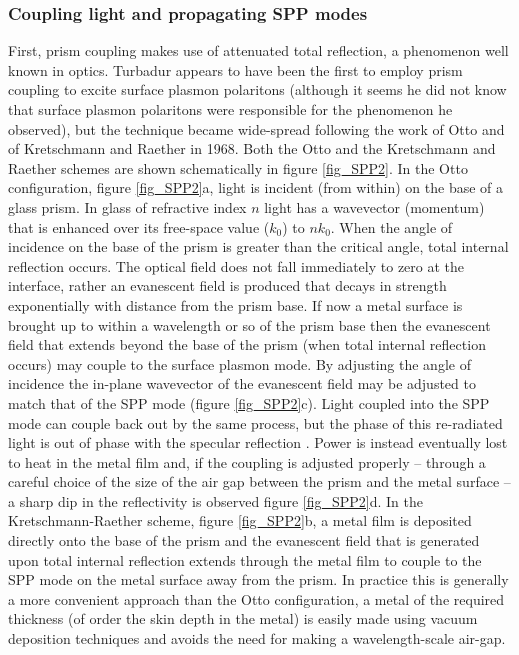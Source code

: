 \documentclass[12pt]{iopart}
\begin{document}
\subsubsection{Coupling light and propagating SPP modes}

First, prism coupling makes use of attenuated total reflection, a phenomenon well known in optics. Turbadur \cite{Turbadar_ProcPhysSoc_1959_73_40} appears to have been the first to employ prism coupling to excite surface plasmon polaritons (although it seems he did not know that surface plasmon polaritons were responsible for the phenomenon he observed), but the technique became wide-spread following the work of Otto \cite{Otto_ZPhys_1968_216_398} and of Kretschmann and Raether \cite{Kretschmann_ZNatur_1968_23_2135} in 1968. Both the Otto and the Kretschmann and Raether schemes are shown schematically in figure \ref{fig_SPP2}. In the Otto configuration, figure \ref{fig_SPP2}a, light is incident (from within) on the base of a glass prism. In glass of refractive index $n$ light has a wavevector (momentum) that is enhanced over its free-space value ($k_0$) to $nk_0$. When the angle of incidence on the base of the prism is greater than the critical angle, total internal reflection occurs. The optical field does not fall immediately to zero at the interface, rather an evanescent field is produced that decays in strength exponentially with distance from the prism base. If now a metal surface is brought up to within a wavelength or so of the prism base then the evanescent field that extends beyond the base of the prism (when total internal reflection occurs) may couple to the surface plasmon mode. By adjusting the angle of incidence the in-plane wavevector of the evanescent field may be adjusted to match that of the SPP mode (figure \ref{fig_SPP2}c). Light coupled into the SPP mode can couple back out by the same process, but the phase of this re-radiated light is out of phase with the specular reflection \cite{Herminghaus_OL_1994_19_293}. Power is instead eventually lost to heat in the metal film and, if the coupling is adjusted properly -- through a careful choice of the size of the air gap between the prism and the metal surface -- a sharp dip in the reflectivity is observed figure \ref{fig_SPP2}d. In the Kretschmann-Raether scheme, figure \ref{fig_SPP2}b, a metal film is deposited directly onto the base of the prism and the evanescent field that is generated upon total internal reflection extends through the metal film to couple to the SPP mode on the metal surface away from the prism. In practice this is generally a more convenient approach than the Otto configuration, a metal of the required thickness (of order the skin depth in the metal) is easily made using vacuum deposition techniques and avoids the need for making a wavelength-scale air-gap.
\end{document}
